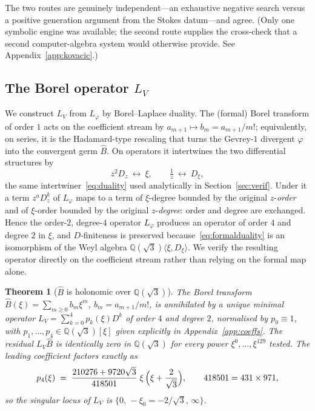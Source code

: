 \documentclass[11pt,reqno]{amsart}
\theoremstyle{plain}
\newtheorem{theorem}{Theorem}[section]
\theoremstyle{definition}
\newcommand{\Bhat}{\widehat{B}}
\newcommand{\Lphi}{L_{\varphi}}
\newcommand{\LV}{L_{V}}
\newcommand{\Qsqrt}{\mathbb{Q}(\sqrt3)}
\newcommand{\xizero}{\xi_0}
\begin{document}
The two routes are genuinely independent---an exhaustive negative search versus a positive
generation argument from the Stokes datum---and agree. (Only one symbolic engine was available;
the second route supplies the cross-check that a second computer-algebra system would otherwise
provide. See Appendix~\ref{app:kovacic}.)

\subsection{The Borel operator \texorpdfstring{$\LV$}{LV}}
We construct $\LV$ from $\Lphi$ by Borel--Laplace duality. The (formal) Borel transform of order
$1$ acts on the coefficient stream by $a_{m+1}\mapsto b_m=a_{m+1}/m!$; equivalently, on series, it
is the Hadamard-type rescaling that turns the Gevrey-$1$ divergent $\varphi$ into the convergent
germ $\Bhat$. On operators it intertwines the two differential structures by
\begin{equation}\label{eq:formalduality}
  z^2 D_z\ \longleftrightarrow\ \xi,\qquad \tfrac1z\ \longleftrightarrow\ D_\xi,
\end{equation}
the same intertwiner~\eqref{eq:duality} used analytically in Section~\ref{sec:verif}. Under it a
term $z^{a}D_z^{k}$ of $\Lphi$ maps to a term of $\xi$-degree bounded by the original
$z$-\emph{order} and of $\xi$-order bounded by the original $z$-\emph{degree}: order and degree are
exchanged. Hence the order-$2$, degree-$4$ operator $\Lphi$ produces an operator of order $4$ and
degree $2$ in $\xi$, and $D$-finiteness is preserved because~\eqref{eq:formalduality} is an
isomorphism of the Weyl algebra $\Qsqrt\langle\xi,D_\xi\rangle$. We verify the resulting operator
directly on the coefficient stream rather than relying on the formal map alone.

\begin{theorem}[$\Bhat$ is holonomic over $\Qsqrt$]\label{thm:LV}
The Borel transform $\Bhat(\xi)=\sum_{m\ge0}b_m\xi^m$, $b_m=a_{m+1}/m!$, is annihilated by a
unique minimal operator $\LV=\sum_{k=0}^4 p_k(\xi)D^k$ of order $4$ and degree $2$, normalised by
$p_0\equiv1$, with $p_1,\dots,p_4\in\Qsqrt[\xi]$ given explicitly in
Appendix~\ref{app:coeffs}. The residual $\LV\Bhat$ is identically zero in $\Qsqrt$ for every power
$\xi^0,\dots,\xi^{129}$ tested. The leading coefficient factors exactly as
\begin{equation}\label{eq:p4-factor}
  p_4(\xi)\;=\;\frac{210276+9720\sqrt3}{418501}\;\xi\,\Bigl(\xi+\frac{2}{\sqrt3}\Bigr),
  \qquad 418501=431\times971,
\end{equation}
so the singular locus of $\LV$ is $\{0,\,-\xizero=-2/\sqrt3,\,\infty\}$.
\end{theorem}
\end{document}
